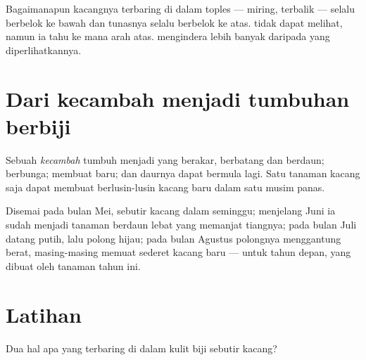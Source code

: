\begin{remark}\label{rem:g2:from-seed-to-plant:updown}
Bagaimanapun kacangnya terbaring di dalam toples --- miring, terbalik
---  selalu berbelok ke bawah dan tunasnya selalu berbelok ke
atas.  tidak dapat melihat, namun ia tahu ke mana arah
atas.  mengindera lebih banyak daripada yang diperlihatkannya.
\end{remark}

\section{Dari kecambah menjadi tumbuhan berbiji}

\begin{proposition}\label{prop:g2:from-seed-to-plant:cycle}
Sebuah \emph{kecambah} tumbuh menjadi 
yang berakar, berbatang dan berdaun;  berbunga;  membuat
\emph{} baru; dan daurnya dapat bermula lagi. Satu tanaman kacang
saja dapat membuat berlusin-lusin kacang baru dalam satu musim panas.
\end{proposition}
\admitted

\begin{example}\label{ex:g2:from-seed-to-plant:summer}
Disemai pada bulan Mei, sebutir kacang  dalam seminggu;
menjelang Juni ia sudah menjadi tanaman berdaun lebat yang memanjat
tiangnya; pada bulan Juli datang  putih, lalu polong hijau;
pada bulan Agustus polongnya menggantung berat, masing-masing memuat
sederet kacang baru ---  untuk tahun depan, yang dibuat oleh
tanaman tahun ini.
\end{example}

\section{Latihan}

\begin{exercise}[$\star$]\label{exo:g2:from-seed-to-plant:1}
Dua hal apa yang terbaring di dalam kulit biji sebutir kacang?
\end{exercise}


